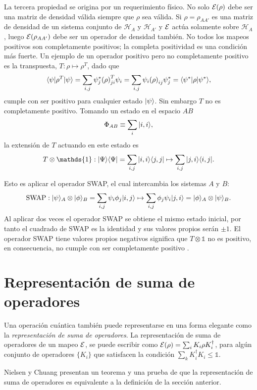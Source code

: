 La tercera propiedad se origina por un requerimiento físico. No solo $\mathcal{E}(\rho)$ debe ser una matriz de densidad válida siempre que $\rho$ sea válida. Si $\rho=\rho_{AA'}$ es una matriz de densidad de un sistema conjunto de $\mathcal{H}_A$ y $\mathcal{H}_{A'}$  y $\mathcal{E}$ actúa solamente sobre $\mathcal{H}_A$, luego $\mathcal{E}(\rho_{AA'})$  debe ser un operador de densidad también. No todos los mapeos positivos son completamente positivos; la completa positividad es una condición más fuerte. Un ejemplo de un operador positivo pero no completamente positivo es la transpuesta, $T:\rho \mapsto {\rho}^T$, dado que \[\langle \psi |{\rho}^T| \psi \rangle=\sum_{i,j} \psi _j^* {(\rho)}^T _{ji} \psi _i=\sum _{i,j} \psi _i{(\rho)} _{ij} \psi_j^{*}=\langle {\psi}^*|\rho|\psi ^*\rangle,\] cumple con ser positivo para cualquier estado $| \psi \rangle$. Sin embargo $ {T} $ no es completamente positivo. Tomando un estado en el espacio $AB$ \[\Phi_{AB} \equiv \sum_i |i,i\rangle, \] la extensión de $T$ actuando en este estado es \[T \otimes \mathds{1}:|\Psi\rala \Psi|=\sum_{i,j}|i,i\rala j,j| \mapsto \sum_{i,j}|j,i\rala i,j|.\]

Esto es aplicar el operador SWAP, el cual intercambia los sistemas $A$ y $B$:
\begin{equation}
    \text{SWAP}:|\psi\rangle_A\otimes|\phi\rangle_B=\sum_{i,j}\psi_i\phi_j |i,j\rangle\mapsto\sum_{i,j}\phi_j\psi_i|j,i\rangle=|\phi\rangle_A\otimes|\psi\rangle_B.
\end{equation} Al aplicar dos veces el operador SWAP se obtiene el mismo estado inicial, por tanto el cuadrado de SWAP es la identidad y sus valores propios serán $\pm 1$. El operador SWAP tiene valores propios negativos significa que $T \otimes \mathds{1}$ no es positivo, en consecuencia, no cumple con ser completamente positivo  {\cite{preskill2020quantum}}.




\section{Representación de suma de operadores} %

Una operación cuántica también puede representarse en una forma elegante como la \textit{representación de suma de operadores}. La representación de suma de operadores de un mapeo $\mathcal{E}$, se puede escribir como $\mathcal{E}(\rho)=\sum_i K_i \rho K_i^\dagger$, para algún conjunto de operadores $\{K_i\}$ que satisfacen la condición $\sum_k K_i^\dagger K_i\le \mathds{1}$.

Nielsen y Chuang {\cite{nielsen_chuang_2010}} presentan un teorema y una prueba de que la representación de suma de operadores es equivalente a la definición de la sección anterior.

